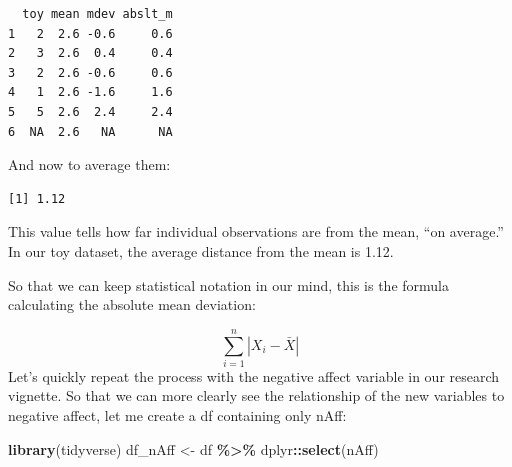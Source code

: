 \documentclass[
  11pt,
]{book}
\newenvironment{Shaded}{\begin{snugshade}}{\end{snugshade}}
\newcommand{\AttributeTok}[1]{\textcolor[rgb]{0.27,0.27,0.27}{#1}}
\newcommand{\ConstantTok}[1]{\textcolor[rgb]{0.37,0.37,0.37}{#1}}
\newcommand{\DecValTok}[1]{\textcolor[rgb]{0.06,0.06,0.06}{#1}}
\newcommand{\FunctionTok}[1]{\textcolor[rgb]{0.27,0.27,0.27}{\textbf{#1}}}
\newcommand{\NormalTok}[1]{#1}
\newcommand{\OtherTok}[1]{\textcolor[rgb]{0.37,0.37,0.37}{#1}}
\newcommand{\SpecialCharTok}[1]{\textcolor[rgb]{0.43,0.43,0.43}{\textbf{#1}}}
\begin{document}
\begin{verbatim}
  toy mean mdev abslt_m
1   2  2.6 -0.6     0.6
2   3  2.6  0.4     0.4
3   2  2.6 -0.6     0.6
4   1  2.6 -1.6     1.6
5   5  2.6  2.4     2.4
6  NA  2.6   NA      NA
\end{verbatim}

And now to average them:

\begin{Shaded}
\end{Shaded}

\begin{verbatim}
[1] 1.12
\end{verbatim}

This value tells how far individual observations are from the mean, ``on average.'' In our toy dataset, the average distance from the mean is 1.12.

So that we can keep statistical notation in our mind, this is the formula calculating the absolute mean deviation:

\[\sum_{i=1}^{n}|X_{i} - \bar{X}|\] Let's quickly repeat the process with the negative affect variable in our research vignette. So that we can more clearly see the relationship of the new variables to negative affect, let me create a df containing only nAff:

\begin{Shaded}
\begin{Highlighting}[]
\FunctionTok{library}\NormalTok{(tidyverse)}
\NormalTok{df\_nAff }\OtherTok{\textless{}{-}}\NormalTok{ df }\SpecialCharTok{\%\textgreater{}\%}
\NormalTok{    dplyr}\SpecialCharTok{::}\FunctionTok{select}\NormalTok{(nAff)}
\end{Highlighting}
\end{Shaded}

\begin{Shaded}
\end{Shaded}
\end{document}
